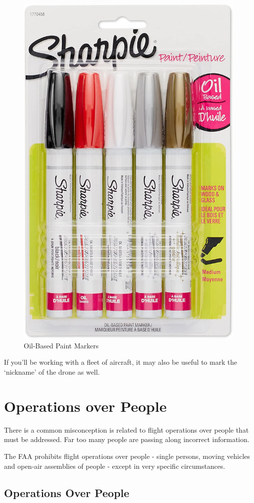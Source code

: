 \documentclass[
  12pt,
]{book}
\newenvironment{notebox}{
  \definecolor{shadecolor}{gray}{.8}  %
  \color{black}
  \begin{shaded}}
 {\end{shaded}}
\begin{document}
\begin{figure}

{\centering \includegraphics[width=0.5\linewidth]{images/oil-based-markers} 

}

\caption{Oil-Based Paint Markers}\label{fig:markers}
\end{figure}

If you'll be working with a fleet of aircraft, it may also be useful to mark the `nickname' of the drone as well.

\hypertarget{operations-over-people}{%
\section{Operations over People}\label{operations-over-people}}

There is a common misconception is related to flight operations over people that must be addressed. Far too many people are passing along incorrect information.

\begin{notebox}
The FAA prohibits flight operations over people - single persons, moving vehicles and open-air assemblies of people - except in very specific circumstances.

\end{notebox}

\hypertarget{operations-over-people-1}{%
\subsection{Operations Over People}\label{operations-over-people-1}}
\end{document}
